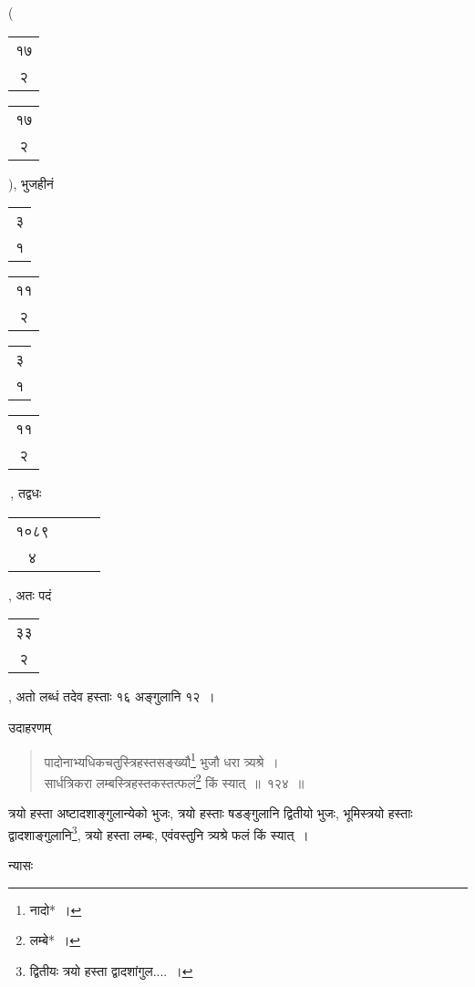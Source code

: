 \documentclass[10pt, openany]{book}
\begin{document}
{{{{{{{{{{{{{{{{{{\bigg(\begin{tabular}{c}१७\\२\end{tabular}\begin{tabular}{|c}१७\\२\end{tabular}\bigg), भुजहीनं
\begin{tabular}{|c|}३\\१\\\hline \end{tabular}\begin{tabular}{c|}११\\२\\\hline \end{tabular}\begin{tabular}{c|}३\\१\\\hline \end{tabular}\begin{tabular}{c|}११\\२\\\hline \end{tabular}\,,
तद्वधः\begin{tabular}{cccl}१०८९\\४\end{tabular}, अतः पदं\begin{tabular}{c}३३\\२\end{tabular}, अतो लब्धं तदेव हस्ताः १६ अङ्गुलानि १२~।
\vspace{3mm}

{उदाहरणम्\textemdash}

\begin{quote}

{\eg पादोनाभ्यधिकचतुस्त्रिहस्तसङ्ख्यौ\renewcommand{\thefootnote}{७}\footnote{नादो*~।} भुजौ धरा त्र्यश्रे~। \\
 सार्धत्रिकरा लम्बस्त्रिहस्तकस्तत्फलं\renewcommand{\thefootnote}{८}\footnote{लम्बे*~।}  किं स्यात्~॥~१२४~॥}
 \end{quote}

{त्रयो हस्ता अष्टादशाङ्गुलान्येको भुजः, त्रयो हस्ताः षडङ्गुलानि
द्वितीयो भुजः,}
{भूमिस्त्रयो हस्ताः द्वादशाङ्गुलानि\renewcommand{\thefootnote}{९}\footnote{द्वितीयः त्रयो हस्ता
द्वादशांगुल....~।}, त्रयो हस्ता लम्बः, एवंवस्तुनि
त्र्यश्रे फलं किं स्यात्~।}
\vspace{3mm}

{न्यासः\textendash \,}
\vspace{-3mm}

}}}}}}}}}}}}}}}}}}
\end{document}
